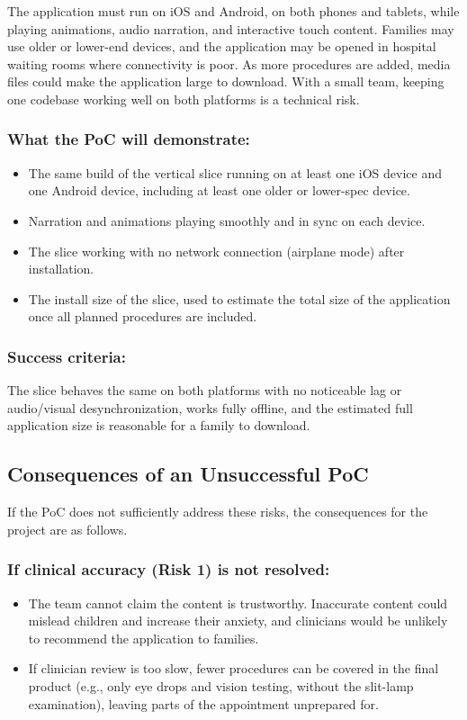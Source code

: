 \documentclass{article}
\begin{document}
The application must run on iOS and Android, on both phones and tablets, while
playing animations, audio narration, and interactive touch content. Families may
use older or lower-end devices, and the application may be opened in hospital
waiting rooms where connectivity is poor. As more procedures are added, media
files could make the application large to download. With a small team, keeping
one codebase working well on both platforms is a technical risk.

\subsubsection*{What the PoC will demonstrate:}
\begin{itemize}
  \item The same build of the vertical slice running on at least one iOS device
  and one Android device, including at least one older or lower-spec device.
  \item Narration and animations playing smoothly and in sync on each device.
  \item The slice working with no network connection (airplane mode) after
  installation.
  \item The install size of the slice, used to estimate the total size of the
  application once all planned procedures are included.
\end{itemize}

\subsubsection*{Success criteria:}
The slice behaves the same on both platforms with no
noticeable lag or audio/visual desynchronization, works fully offline, and the
estimated full application size is reasonable for a family to download.

\subsection{Consequences of an Unsuccessful PoC}

If the PoC does not sufficiently address these risks, the consequences for the
project are as follows.

\subsubsection*{If clinical accuracy (Risk 1) is not resolved:}
\begin{itemize}
  \item The team cannot claim the content is trustworthy. Inaccurate content
  could mislead children and increase their anxiety, and clinicians would be
  unlikely to recommend the application to families.
  \item If clinician review is too slow, fewer procedures can be covered in the
  final product (e.g., only eye drops and vision testing, without the slit-lamp
  examination), leaving parts of the appointment unprepared for.
\end{itemize}
\end{document}
